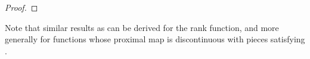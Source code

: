 \documentclass[leqno,onefignum,onetabnum]{siamart0516}
\newcommand{\ie}{{i.e.}\xspace}
\newcommand{\xb}{\mathbf{x}}
\newcommand{\prox}[2][\eta]{\mathrm{prox}_{#2}^{#1}}
\newcommand{\ovset}[2]{\overset{\mathrm{#1}}{#2}}
\begin{document}
\begin{proof}
%
%
\end{proof}

Note that similar results as  can be derived for the rank function, and more generally for functions whose proximal map is discontinuous with pieces satisfying .



\end{document}
